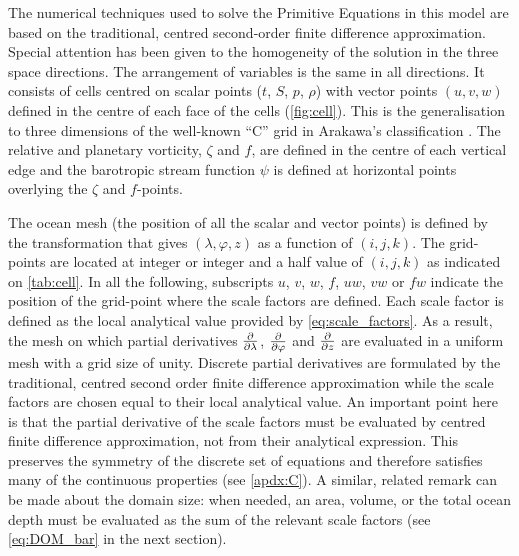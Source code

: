 \documentclass[../main/NEMO_manual]{subfiles}
\begin{document}
The numerical techniques used to solve the Primitive Equations in this model are based on the traditional,
centred second-order finite difference approximation.
Special attention has been given to the homogeneity of the solution in the three space directions.
The arrangement of variables is the same in all directions.
It consists of cells centred on scalar points ($t$, $S$, $p$, $\rho$) with vector points $(u, v, w)$ defined in
the centre of each face of the cells (\autoref{fig:cell}).
This is the generalisation to three dimensions of the well-known ``C'' grid in Arakawa's classification
\citep{Mesinger_Arakawa_Bk76}.
The relative and planetary vorticity, $\zeta$ and $f$, are defined in the centre of each vertical edge and
the barotropic stream function $\psi$ is defined at horizontal points overlying the $\zeta$ and $f$-points.

The ocean mesh (\ie the position of all the scalar and vector points) is defined by the transformation that
gives $(\lambda,\varphi,z)$ as a function of $(i,j,k)$.
The grid-points are located at integer or integer and a half value of $(i,j,k)$ as indicated on \autoref{tab:cell}.
In all the following, subscripts $u$, $v$, $w$, $f$, $uw$, $vw$ or $fw$ indicate the position of
the grid-point where the scale factors are defined.
Each scale factor is defined as the local analytical value provided by \autoref{eq:scale_factors}.
As a result, the mesh on which partial derivatives $\pd[]{\lambda}$, $\pd[]{\varphi}$ and
$\pd[]{z}$ are evaluated in a uniform mesh with a grid size of unity.
Discrete partial derivatives are formulated by the traditional, centred second order finite difference approximation
while the scale factors are chosen equal to their local analytical value.
An important point here is that the partial derivative of the scale factors must be evaluated by
centred finite difference approximation, not from their analytical expression.
This preserves the symmetry of the discrete set of equations and therefore satisfies many of
the continuous properties (see \autoref{apdx:C}).
A similar, related remark can be made about the domain size:
when needed, an area, volume, or the total ocean depth must be evaluated as the sum of the relevant scale factors
(see \autoref{eq:DOM_bar} in the next section).
\end{document}
